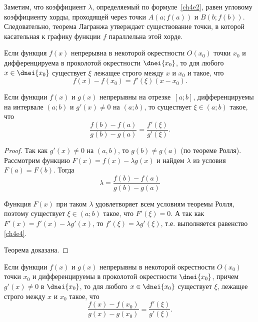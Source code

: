\begin{notion}
Заметим, что коэффициент $\lambda$, определяемый по формуле~\eqref{ch4e2}, равен угловому коэффициенту хорды, проходящей через точки $A(a;f(a))$ и $B(b;f(b))$. Следовательно, теорема Лагранжа утверждает существование точки, в которой касательная к графику функции $f$ параллельна этой хорде.
\end{notion}

\begin{cons} \label{ch4.1cons4}
Если функция $f(x)$ непрерывна в некоторой окрестности $O(x_0)$ точки $x_0$ и дифференцируема в проколотой
окрестности $\dnei{x_0}$, то для любого $x \in \dnei{x_0}$ существует $\xi$ лежащее строго между $x$ и $x_0$ и такое, что
\begin{equation}\label{ch4e3}
f(x)-f(x_0)=f'(\xi)(x-x_0).
\end{equation}
\end{cons}

\begin{thm}  Если функции $f(x)$ и $g(x)$ непрерывны на отрезке~$[a; b]$, дифференцируемы на интервале $(a; b)$ и $g'(x) \ne 0$ на $(a; b)$, то существует $\xi \in (a; b)$ такое, что
\begin{equation}
\label{ch4e4}
\frac{f(b)-f(a)}{g(b)-g(a)}=\frac{f'(\xi)}{g'(\xi)}.
\end{equation}
\end{thm}

\begin{proof} Так как $g'(x) \ne 0$ на $(a,b)$, то $g(b)\ne g(a)$ (по теореме Ролля). Рассмотрим функцию $F(x) =f(x) - \lambda g(x)$ и найдем $\lambda$ из условия $F(a) = F(b)$. Тогда
$$
\lambda = \frac{f(b)-f(a)}{g(b)-g(a)}
$$

Функция $F(x)$ при таком $\lambda$ удовлетворяет всем условиям теоремы Ролля, поэтому существует $\xi \in (a; b)$ такое, что $F'(\xi) = 0$. А так как $F'(x) = f'(x) - \lambda g'(x)$, то $f'(\xi) = \lambda g'(\xi)$, т.е. выполняется равенство \eqref{ch4e4}.

Теорема доказана.
\end{proof}

\begin{cons} \label{ch4.1cons5}
	Если функции $f(x)$ и $g(x)$ непрерывны в некоторой окрестности $O(x_0)$ точки $x_0$ и дифференцируемы в проколотой
окрестности $\dnei{x_0}$, причем $g'(x) \ne 0$ в  $\dnei{x_0}$, то  для любого $x \in  \dnei{x_0}$ существует $\xi$, лежащее строго между $x$ и $x_0$ такое, что
$$
\frac{f(x)-f(x_0)}{g(x)-g(x_0)}=\frac{f'(\xi)}{g'(\xi)}.
$$
\end{cons}